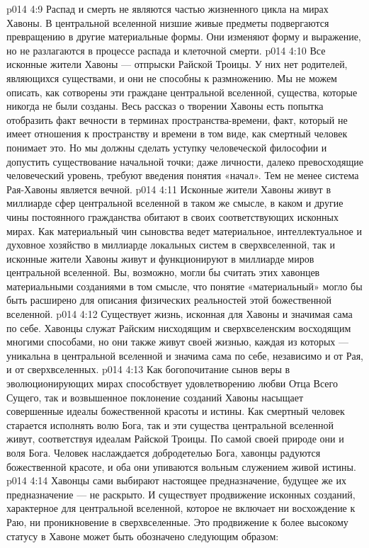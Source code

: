 \vs p014 4:9 \pc Распад и смерть не являются частью жизненного цикла на мирах Хавоны. В центральной вселенной низшие живые предметы подвергаются превращению в другие материальные формы. Они изменяют форму и выражение, но не разлагаются в процессе распада и клеточной смерти.
\vs p014 4:10 \pc Все исконные жители Хавоны --- отпрыски Райской Троицы. У них нет родителей, являющихся существами, и они не способны к размножению. Мы не можем описать, как сотворены эти граждане центральной вселенной, существа, которые никогда не были созданы. Весь рассказ о творении Хавоны есть попытка отобразить факт вечности в терминах пространства\hyp{}времени, факт, который не имеет отношения к пространству и времени в том виде, как смертный человек понимает это. Но мы должны сделать уступку человеческой философии и допустить существование начальной точки; даже личности, далеко превосходящие человеческий уровень, требуют введения понятия «начал». Тем не менее система Рая\hyp{}Хавоны является вечной.
\vs p014 4:11 Исконные жители Хавоны живут в миллиарде сфер центральной вселенной в таком же смысле, в каком и другие чины постоянного гражданства обитают в своих соответствующих исконных мирах. Как материальный чин сыновства ведет материальное, интеллектуальное и духовное хозяйство в миллиарде локальных систем в сверхвселенной, так и исконные жители Хавоны живут и функционируют в миллиарде миров центральной вселенной. Вы, возможно, могли бы считать этих хавонцев материальными созданиями в том смысле, что понятие «материальный» могло бы быть расширено для описания физических реальностей этой божественной вселенной.
\vs p014 4:12 Существует жизнь, исконная для Хавоны и значимая сама по себе. Хавонцы служат Райским нисходящим и сверхвселенским восходящим многими способами, но они также живут своей жизнью, каждая из которых --- уникальна в центральной вселенной и значима сама по себе, независимо и от Рая, и от сверхвселенных.
\vs p014 4:13 Как богопочитание сынов веры в эволюционирующих мирах способствует удовлетворению любви Отца Всего Сущего, так и возвышенное поклонение созданий Хавоны насыщает совершенные идеалы божественной красоты и истины. Как смертный человек старается исполнять волю Бога, так и эти существа центральной вселенной живут, соответствуя идеалам Райской Троицы. По самой своей природе они и  воля Бога. Человек наслаждается добродетелью Бога, хавонцы радуются божественной красоте, и оба они упиваются вольным служением живой истины.
\vs p014 4:14 Хавонцы сами выбирают настоящее предназначение, будущее же их предназначение --- не раскрыто. И существует продвижение исконных созданий, характерное для центральной вселенной, которое не включает ни восхождение к Раю, ни проникновение в сверхвселенные. Это продвижение к более высокому статусу в Хавоне может быть обозначено следующим образом:
